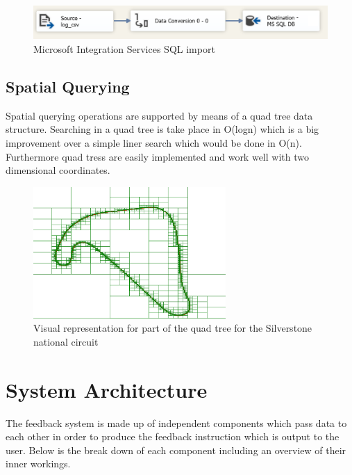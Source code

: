 \begin{figure}[!htb]
	\centering
	\includegraphics[width=\textwidth]{diagrams/ssis.png}
	\caption{Microsoft Integration Services SQL import}
	\label{fig:ssis}
\end{figure}

\subsection{Spatial Querying}
\label{sec:imp-SpatialQuerying}
Spatial querying operations are supported by means of a quad tree data structure. Searching in a quad tree is take place in O(logn) which is a big improvement over a simple liner search which would be done in O(n). Furthermore quad tress are easily implemented and work well with two dimensional coordinates.

\begin{figure}[!htb]
	\centering
	\includegraphics[height=5cm]{images/QuadTree}
	\caption{Visual representation for part of the quad tree for the Silverstone national circuit}
	\label{fig:QuadTree}
\end{figure}

\section{System Architecture}
\label{sec:imp-systemArchitecture}
The feedback system is made up of independent components which pass data to each other in order to produce the feedback instruction which is output to the user. Below is the break down of each component including an overview of their inner workings.

